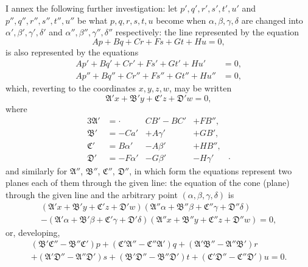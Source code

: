 \documentclass[11pt,a4paper]{book}
\begin{document}
I annex the following further investigation: let $p', q', r', s', t', u'$ and $p'', q'', r'', s'', t'', u''$ be what $p, q, r, s, t, u$ become when $\alpha, \beta, \gamma, \delta$ are changed into $\alpha', \beta', \gamma', \delta'$ and $\alpha'', \beta'', \gamma'', \delta''$ respectively: the line represented by the equation
\[
Ap + Bq + Cr + Fs + Gt + Hu = 0,
\]
is also represented by the equations
\begin{align*}
Ap' + Bq' + Cr' + Fs' + Gt' + Hu' &= 0,\\
Ap'' + Bq'' + Cr'' + Fs'' + Gt'' + Hu'' &= 0,
\end{align*}
which, reverting to the coordinates $x, y, z, w$, may be written
\[
\mathfrak{A}'x + \mathfrak{B}'y + \mathfrak{C}'z + \mathfrak{D}'w = 0,
\]
where
\begin{alignat*}{3}
\mathfrak{A}' &= \cdot\qquad & CB' - BC' &+ FB'',\\
\mathfrak{B}' &= -Ca' &+ A\gamma' &+ GB',\\
\mathfrak{C}' &= B\alpha' &- A\beta' &+ HB'',\\
\mathfrak{D}' &= -F\alpha' &- G\beta' &- H\gamma' &\cdot
\end{alignat*}
and similarly for $\mathfrak{A}''$, $\mathfrak{B}''$, $\mathfrak{C}''$, $\mathfrak{D}''$, in which form the equations represent two planes each of them through the given line: the equation of the cone (plane) through the given line and the arbitrary point $(\alpha, \beta, \gamma, \delta)$ is
\begin{multline*}
(\mathfrak{A}'x + \mathfrak{B}'y + \mathfrak{C}'z + \mathfrak{D}'w)(\mathfrak{A}''\alpha + \mathfrak{B}''\beta + \mathfrak{C}''\gamma + \mathfrak{D}''\delta)\\
- (\mathfrak{A}'\alpha + \mathfrak{B}'\beta + \mathfrak{C}'\gamma + \mathfrak{D}'\delta)(\mathfrak{A}''x + \mathfrak{B}''y + \mathfrak{C}''z + \mathfrak{D}''w) = 0,
\end{multline*}
or, developing,
\begin{multline*}
(\mathfrak{B}'\mathfrak{C}'' - \mathfrak{B}''\mathfrak{C}')p + (\mathfrak{C}'\mathfrak{A}'' - \mathfrak{C}''\mathfrak{A}')q + (\mathfrak{A}'\mathfrak{B}'' - \mathfrak{A}''\mathfrak{B}')r\\
+ (\mathfrak{A}'\mathfrak{D}'' - \mathfrak{A}''\mathfrak{D}')s + (\mathfrak{B}'\mathfrak{D}'' - \mathfrak{B}''\mathfrak{D}')t + (\mathfrak{C}'\mathfrak{D}'' - \mathfrak{C}''\mathfrak{D}')u = 0.
\end{multline*}
\end{document}
